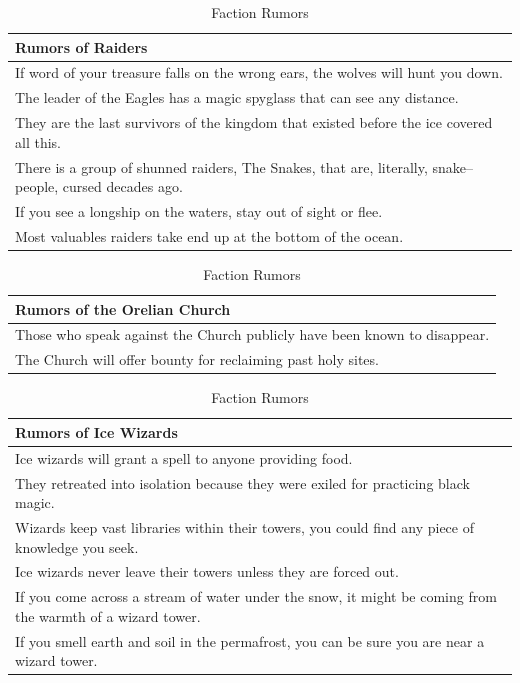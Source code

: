 \documentclass[notitlepage]{article}
\begin{document}
\begin{table}[h]
  \centering
  \begin{tabular}{|p{}|}
    \hline Rumors of Raiders \\ \hline \hline
    If word of your treasure falls on the wrong ears, the wolves will hunt you down. \\ \hline
    The leader of the Eagles has a magic spyglass that can see any distance. \\ \hline
    They are the last survivors of the kingdom that existed before the ice covered all this. \\ \hline
    There is a group of shunned raiders, The Snakes, that are, literally, snake--people, cursed decades ago. \\ \hline
    If you see a longship on the waters, stay out of sight or flee. \\ \hline
    Most valuables raiders take end up at the bottom of the ocean. \\ \hline
  \end{tabular} \begin{tabular}{|p{}|}
                  \hline Rumors of the Orelian Church \\ \hline \hline
                  Those who speak against the Church publicly have been known to disappear. \\ \hline
                  The Church will offer bounty for reclaiming past holy sites. \\ \hline
                  
  \end{tabular} \begin{tabular}{|p{}|}
    \hline Rumors of Ice Wizards \\ \hline \hline
    Ice wizards will grant a spell to anyone providing food. \\ \hline
    They retreated into isolation because they were exiled for practicing black magic. \\ \hline
    Wizards keep vast libraries within their towers, you could find any piece of knowledge you seek. \\ \hline
    Ice wizards never leave their towers unless they are forced out. \\ \hline
    If you come across a stream of water under the snow, it might be coming from the warmth of a wizard tower. \\ \hline
    If you smell earth and soil in the permafrost, you can be sure you are near a wizard tower. \\ \hline
   \end{tabular}
   \caption{Faction Rumors}
  \label{tab:rumors}
\end{table}
\end{document}
